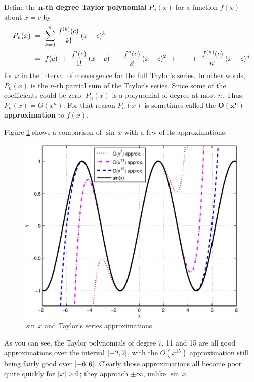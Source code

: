 \divider
\newpage
\noindent Define the \textbf{$\bm{n}$-th degree Taylor polynomial} $P_n(x)$ for
a function $f(x)$ about $x=c$ by
\begin{align*}
P_n(x) ~&=~ \bigsum{k=0}{n}~ \frac{f^{(k)}(c)}{k !}\,(x-c)^k\\
&=~ f(c) ~+~ \frac{f'(c)}{1 !}\,(x-c) ~+~ \frac{f''(c)}{2 !}\,(x-c)^2 ~+~ \cdots ~+~
\frac{f^{(n)}(c)}{n !}\,(x-c)^n
\end{align*}
for $x$ in the interval of convergence for the full Taylor's series. In other
words, $P_n(x)$ is the $n$-th partial sum of the Taylor's series. Since some of
the coefficients could be zero, $P_n(x)$ is a polynomial of degree at most
$n$. Thus, $P_n(x) = O(x^n)$. For that reason $P_n(x)$ is
sometimes called the \textbf{$\bm{O(x^n)}$ approximation} to $f(x)$.

Figure \ref{fig:sinetaylor} shows a comparison of $\sin\,x$ with a few
of its approximations:\vspace{-3mm}

\begin{figure}[ht]
\centering
\includegraphics[scale=0.70]{sinetaylor}\vspace{-2mm}
\caption[]{\enskip $\sin\,x$ and Taylor's series approximations}
\label{fig:sinetaylor}
\end{figure}

As you can see, the Taylor polynomials of degree 7, 11 and 15 are all good
approximations over the interval $\lbrack -2,2 \rbrack$, with the $O(x^{15})$
approximation still being fairly good over $\lbrack -6,6 \rbrack$. Clearly those
approximations all become poor quite quickly for $\lvert\mspace{1mu}x\mspace{1mu}\rvert > 6$; they approach
$\pm\infty$, unlike $\sin\,x$.

